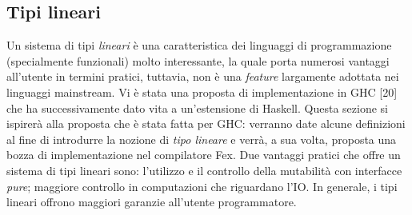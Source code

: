 \documentclass[10pt,a4paper]{article}
\begin{document}
\subsection{Tipi lineari}
Un sistema di tipi \textit{lineari} è una caratteristica dei linguaggi di programmazione (specialmente funzionali) molto
interessante, la quale porta numerosi vantaggi all'utente in termini pratici, tuttavia, non è una \textit{feature}
largamente adottata nei linguaggi mainstream. Vi è stata una proposta di implementazione in GHC [20] che ha
successivamente dato vita a un'estensione di Haskell. Questa sezione si ispirerà alla proposta che è stata fatta per GHC:
verranno date alcune definizioni al fine di introdurre la nozione di \textit{tipo lineare} e verrà, a sua volta, proposta una
bozza di implementazione nel compilatore Fex. Due vantaggi pratici che offre un sistema di tipi lineari sono: l'utilizzo
e il controllo della mutabilità con interfacce \textit{pure}; maggiore controllo in computazioni che riguardano l'IO.
In generale, i tipi lineari offrono maggiori garanzie all'utente programmatore.
\end{document}
